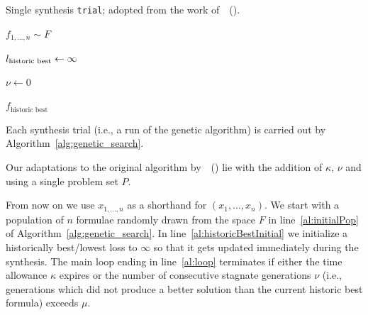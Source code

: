 \documentclass[letterpaper]{article}
\newcommand{\citea}[1]{\citeauthor{#1}~(\citeyear{#1})}
\begin{document}
\begin{algorithm}[t]
\DontPrintSemicolon
\caption{Single synthesis {\tt trial}; adopted from the work of~\citea{bulitko2022portability}.}
\label{alg:genetic_search}
{\footnotesize
{}

$ f_{1,\dots,n} \sim F $ \; \label{al:initialPop}

$l_\text{\rm historic best} \gets \infty$ \; \label{al:historicBestInitial}

$ \nu \gets 0 $ \; \label{al:numStagInit}

  \label{al:loop}

\Return $ f_\text{historic best} $ \; \label{al:return_best}
}
\end{algorithm}

Each synthesis trial (i.e., a run of the genetic algorithm) is carried out by Algorithm~\ref{alg:genetic_search}.

Our adaptations to the original algorithm by~\citea{bulitko2022portability} lie with the addition of $ \kappa $, $ \nu $ and using a single problem set $ P $.

From now on we use $ x_{1, \dots, n} $ as a shorthand for $ (x_1, \dots, x_n) $. We start with a population of $ n $ formulae randomly drawn from the space $ F $ in line~\ref{al:initialPop} of Algorithm~\ref{alg:genetic_search}. In line~\ref{al:historicBestInitial} we initialize a historically best/lowest loss to $ \infty $ so that it gets updated immediately during the synthesis. The main loop ending in line~\ref{al:loop} terminates if either the time allowance $ \kappa $ expires or the number of consecutive stagnate generations $ \nu $ (i.e., generations which did not produce a better solution than the current historic best formula) exceeds $ \mu $.
\end{document}
